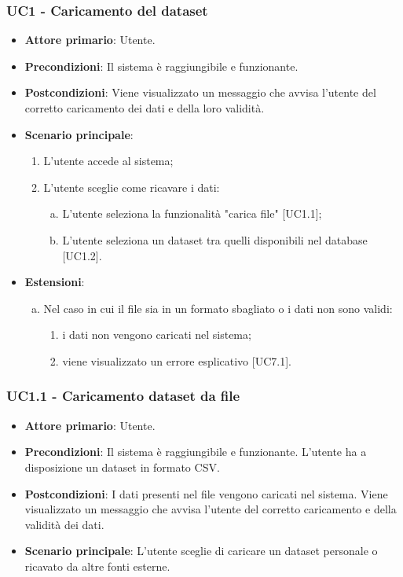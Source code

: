 \subsubsection{UC1 - Caricamento del dataset}

\begin{itemize}
	\item \textbf{Attore primario}: Utente.
	\item \textbf{Precondizioni}: Il sistema è raggiungibile e funzionante.
	\item \textbf{Postcondizioni}: Viene visualizzato un messaggio che avvisa l'utente del corretto caricamento dei dati e della loro validità.
	\item \textbf{Scenario principale}:
		\begin{enumerate}
			\item L'utente accede al sistema;
			\item L'utente sceglie come ricavare i dati:
				\begin{enumerate}[(a)]
			\item L'utente seleziona la funzionalità "carica file" [UC1.1];
			\item L'utente seleziona un dataset tra quelli disponibili nel database [UC1.2].
				\end{enumerate}
		\end{enumerate}
	\item \textbf{Estensioni}:
	\begin{enumerate}[(a)]
		\item Nel caso in cui il file sia in un formato sbagliato o i dati non sono validi:
		\begin{enumerate}[1.]
			\item i dati non vengono caricati nel sistema;
			\item viene visualizzato un errore esplicativo [UC7.1].
		\end{enumerate}
	\end{enumerate}
\end{itemize}

\subsubsection{UC1.1 - Caricamento dataset da file}

\begin{itemize}
	\item \textbf{Attore primario}: Utente.
	\item \textbf{Precondizioni}: Il sistema è raggiungibile e funzionante. L'utente ha a disposizione un dataset in formato CSV.
	\item \textbf{Postcondizioni}: I dati presenti nel file vengono caricati nel sistema. Viene visualizzato un messaggio che avvisa l'utente del corretto caricamento e della validità dei dati.
	\item \textbf{Scenario principale}: L'utente sceglie di caricare un dataset personale o ricavato da altre fonti esterne.
	
\end{itemize}

